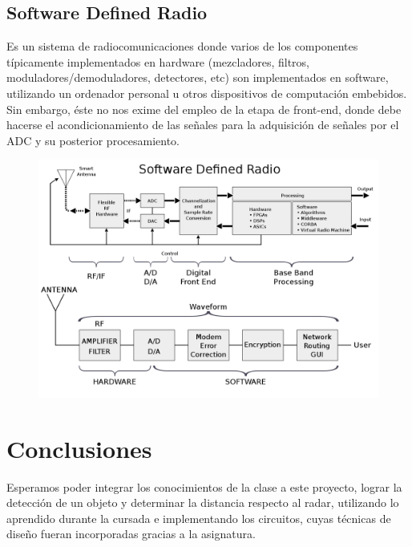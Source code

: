 \documentclass{article}
\begin{document}
{\subsection{Software Defined Radio}
Es un sistema de radiocomunicaciones donde varios de los componentes típicamente implementados en hardware (mezcladores, filtros, moduladores/demoduladores, detectores, etc) son implementados en software, utilizando un ordenador personal u otros dispositivos de computación embebidos.  
Sin embargo, éste no nos exime del empleo de la etapa de front-end, donde debe hacerse el acondicionamiento de las señales para la adquisición de señales por el ADC y su posterior procesamiento. 
\begin{figure}[H]
  \centering
    \includegraphics[scale=0.3]{SDR}
  \caption{  }
\end{figure}
}%











\section{Conclusiones}

Esperamos poder integrar los conocimientos de la clase a este proyecto, lograr la detección de un objeto y determinar la distancia respecto al radar, utilizando lo aprendido durante la cursada e implementando los circuitos, cuyas técnicas de diseño fueran incorporadas gracias a la asignatura.
\end{document}
